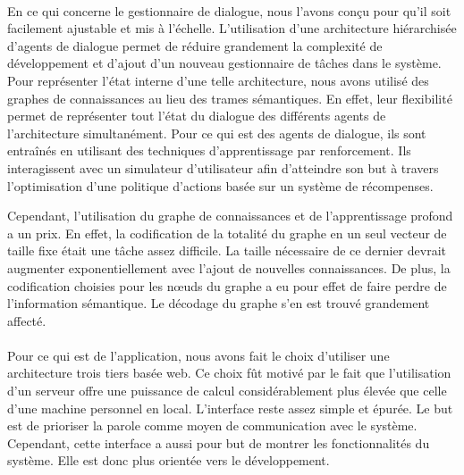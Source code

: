 
\paragraph{}
En ce qui concerne le gestionnaire de dialogue, nous l'avons conçu pour qu'il soit facilement ajustable et mis à l'échelle. L'utilisation d'une architecture hiérarchisée d'agents de dialogue permet de réduire grandement la complexité de développement et d'ajout d'un nouveau gestionnaire de tâches dans le système.  Pour représenter l'état interne d'une telle architecture, nous avons utilisé des graphes de connaissances au lieu des trames sémantiques. En effet, leur flexibilité permet de représenter tout l'état du dialogue des différents agents de l'architecture simultanément. Pour ce qui est des agents de dialogue, ils sont entraînés en utilisant des techniques d'apprentissage par renforcement. Ils interagissent avec un simulateur d'utilisateur afin d'atteindre son but à travers l'optimisation d'une politique d'actions basée sur un système de récompenses.

Cependant, l'utilisation du graphe de connaissances et de l'apprentissage profond a un prix. En effet, la codification de la totalité du graphe en un seul vecteur de taille fixe était une tâche assez difficile. La taille nécessaire de ce dernier devrait augmenter exponentiellement avec l'ajout de nouvelles connaissances. De plus, la codification choisies pour les n\oe{}uds du graphe a eu pour effet de faire perdre de l'information sémantique. Le décodage du graphe s'en est trouvé grandement affecté.





\paragraph{}
Pour ce qui est de l'application, nous avons fait le choix d'utiliser une architecture trois tiers basée web. Ce choix fût motivé par le fait que l'utilisation d'un serveur offre une puissance de calcul considérablement plus élevée que celle d'une machine personnel en local. L'interface reste assez simple et épurée. Le but est de prioriser la parole comme moyen de communication avec le système. Cependant, cette interface a aussi pour but de montrer les fonctionnalités du système. Elle est donc plus orientée vers le développement.



